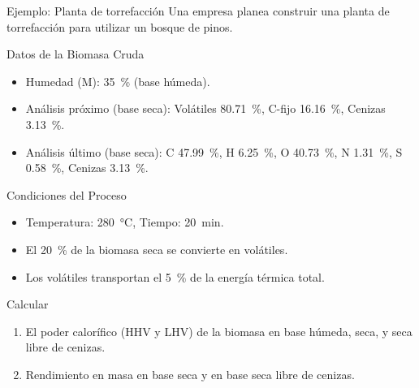 \documentclass[main.tex]{subfiles}
\begin{document}
\begin{frame}[allowframebreaks]{Ejemplo: Planta de torrefacción}
\footnotesize
Una empresa planea construir una planta de torrefacción para utilizar un bosque de pinos.
\begin{block}{Datos de la Biomasa Cruda}
\begin{itemize}
    \item Humedad (M): \SI{35}{\percent} (base húmeda).
    \item Análisis próximo (base seca): Volátiles \SI{80.71}{\percent}, C-fijo \SI{16.16}{\percent}, Cenizas \SI{3.13}{\percent}.
    \item Análisis último (base seca): C \SI{47.99}{\percent}, H \SI{6.25}{\percent}, O \SI{40.73}{\percent}, N \SI{1.31}{\percent}, S \SI{0.58}{\percent}, Cenizas \SI{3.13}{\percent}.
\end{itemize}
\end{block}
\begin{block}{Condiciones del Proceso}
\begin{itemize}
    \item Temperatura: \SI{280}{\celsius}, Tiempo: \SI{20}{\minute}.
    \item El \SI{20}{\percent} de la biomasa seca se convierte en volátiles.
    \item Los volátiles transportan el \SI{5}{\percent} de la energía térmica total.
\end{itemize}
\end{block}
\begin{alertblock}{Calcular}
\begin{enumerate}
  \item El poder calorífico (HHV y LHV) de la biomasa en base húmeda, seca, y seca libre de cenizas.
  \item Rendimiento en masa en base seca y en base seca libre de cenizas.
\end{enumerate}
\end{alertblock}
\end{frame}
\end{document}
